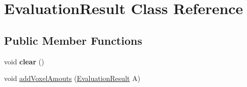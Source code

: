 \hypertarget{classEvaluationResult}{}\section{Evaluation\+Result Class Reference}
\label{classEvaluationResult}
\subsection*{Public Member Functions}
\begin{DoxyCompactItemize}
\item 
void {\bfseries clear} ()\hypertarget{classEvaluationResult_a5cb958df5f08e1c4d070f0ca6ae1514b}{}\label{classEvaluationResult_a5cb958df5f08e1c4d070f0ca6ae1514b}

\item 
void \hyperlink{classEvaluationResult_a529bd3f6b511988d0ddbbd2fee1e370b}{add\+Voxel\+Amouts} (\hyperlink{classEvaluationResult}{Evaluation\+Result} A)
\end{DoxyCompactItemize}
